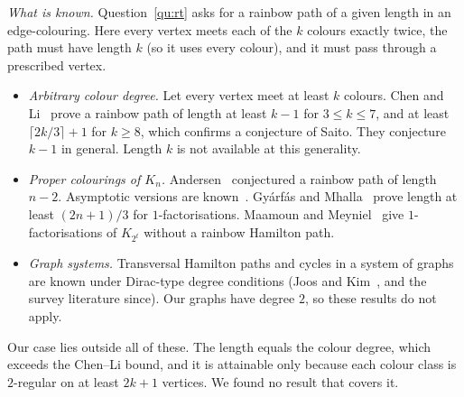 \documentclass[11pt]{amsart}
\theoremstyle{definition}
\begin{document}
\emph{What is known.} Question~\ref{qu:rt} asks for a rainbow path of a given length in an
edge-colouring. Here every vertex meets each of the $k$ colours exactly twice, the path must have
length $k$ (so it uses every colour), and it must pass through a prescribed vertex.
\begin{itemize}
\item \emph{Arbitrary colour degree.} Let every vertex meet at least $k$ colours. Chen and
Li~\cite{CL05,CL06} prove a rainbow path of length at least $k-1$ for $3\le k\le7$, and at least
$\lceil 2k/3\rceil+1$ for $k\ge8$, which confirms a conjecture of Saito. They conjecture $k-1$ in
general. Length $k$ is not available at this generality.
\item \emph{Proper colourings of $K_n$.} Andersen~\cite{And89} conjectured a rainbow path of length
$n-2$. Asymptotic versions are known~\cite{APS17}. Gyárfás and Mhalla~\cite{GM10} prove length at
least $(2n+1)/3$ for $1$-factorisations. Maamoun and Meyniel~\cite{MaMe84} give $1$-factorisations of
$K_{2^t}$ without a rainbow Hamilton path.
\item \emph{Graph systems.} Transversal Hamilton paths and cycles in a system of graphs are known
under Dirac-type degree conditions (Joos and Kim~\cite{JK20}, and the survey literature since).
Our graphs have degree $2$, so these results do not apply.
\end{itemize}
Our case lies outside all of these. The length equals the colour degree, which exceeds the Chen--Li
bound, and it is attainable only because each colour class is $2$-regular on at least $2k+1$
vertices. We found no result that covers it.
\end{document}
